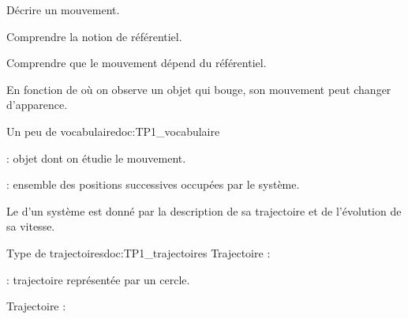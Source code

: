\teteSndMouv

\nomPrenomClasse
{}

\begin{objectifs}
  \item Décrire un mouvement.
  \item Comprendre la notion de référentiel.
  \item Comprendre que le mouvement dépend du référentiel.
\end{objectifs}

\begin{contexte}
  En fonction de où on observe un objet qui bouge, son mouvement peut changer d'apparence.

\end{contexte}



\vspace*{6pt}
\begin{doc}{Un peu de vocabulaire}{doc:TP1_vocabulaire}
  \begin{importants}
     : objet dont on étudie le mouvement.
  \end{importants}
  
  \begin{importants}
     : ensemble des positions successives occupées par le système.
  \end{importants}
  
  Le  d'un système est donné par la description de sa trajectoire et de l'évolution de sa vitesse.
\end{doc} 


\begin{doc}{Type de trajectoires}{doc:TP1_trajectoires}
  Trajectoire  : 
  
   : trajectoire représentée par un cercle.
  
  Trajectoire  : 
\end{doc}


